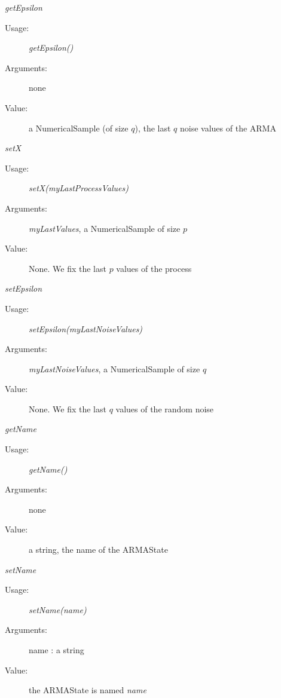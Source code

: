 \begin{description}
\begin{description}
\item \textit{getEpsilon}
\begin{description}
\item[Usage:] \textit{getEpsilon()}
\item[Arguments:] none
\item[Value:] a NumericalSample (of size $q$), the last $q$ noise values of the ARMA
\end{description}
\bigskip

\item \textit{setX}
\begin{description}
\item[Usage:] \textit{setX(myLastProcessValues)}
\item[Arguments:] \textit{myLastValues}, a NumericalSample of size $p$
\item[Value:] None. We fix the last $p$ values of the process
\end{description}
\bigskip

\item \textit{setEpsilon}
\begin{description}
\item[Usage:] \textit{setEpsilon(myLastNoiseValues)}
\item[Arguments:] \textit{myLastNoiseValues}, a NumericalSample of size $q$
\item[Value:] None. We fix the last $q$ values of the random noise
\end{description}
\bigskip

\item \textit{getName}
\begin{description}
\item[Usage:] \textit{getName()}
\item[Arguments:] none
\item[Value:] a string, the name of the ARMAState
\end{description}
\bigskip

\item \textit{setName}
\begin{description}
\item[Usage:] \textit{setName(name)}
\item[Arguments:] name : a string
\item[Value:] the ARMAState is named \textit{name}
\end{description}

\end{description}

\end{description}

